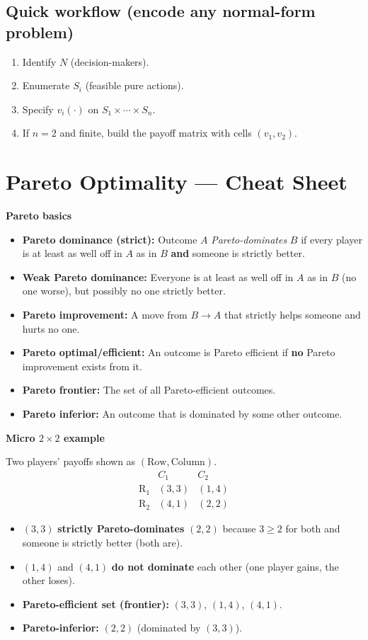 \documentclass[11pt]{article}
\begin{document}
\begin{multicols}{2}
\subsection*{Quick workflow (encode any normal-form problem)}
\begin{enumerate}[label=\arabic*)]
  \item Identify $N$ (decision-makers).
  \item Enumerate $S_i$ (feasible pure actions).
  \item Specify $v_i(\cdot)$ on $S_1\times\cdots\times S_n$.
  \item If $n=2$ and finite, build the payoff matrix with cells $(v_1,v_2)$.
\end{enumerate}


\newpage
\section*{Pareto Optimality — Cheat Sheet}

\textbf{Pareto basics}
\begin{itemize}
  \item \textbf{Pareto dominance (strict):} Outcome $A$ \emph{Pareto-dominates} $B$ if every player is at least as well off in $A$ as in $B$ \textbf{and} someone is strictly better.
  \item \textbf{Weak Pareto dominance:} Everyone is at least as well off in $A$ as in $B$ (no one worse), but possibly no one strictly better.
  \item \textbf{Pareto improvement:} A move from $B \to A$ that strictly helps someone and hurts no one.
  \item \textbf{Pareto optimal/efficient:} An outcome is Pareto efficient if \textbf{no} Pareto improvement exists from it.
  \item \textbf{Pareto frontier:} The set of all Pareto-efficient outcomes.
  \item \textbf{Pareto inferior:} An outcome that is dominated by some other outcome.
\end{itemize}

\textbf{Micro $2\times2$ example}

Two players’ payoffs shown as $(\text{Row}, \text{Column})$.
\[
\begin{array}{c|cc}
    & C_1     & C_2     \\\hline
\text{R}_1 & (3,3)   & (1,4)   \\
\text{R}_2 & (4,1)   & (2,2)
\end{array}
\]
\begin{itemize}
  \item $(3,3)$ \textbf{strictly Pareto-dominates} $(2,2)$ because $3\geq 2$ for both and someone is strictly better (both are).
  \item $(1,4)$ and $(4,1)$ \textbf{do not dominate} each other (one player gains, the other loses).
  \item \textbf{Pareto-efficient set (frontier):} $(3,3)$, $(1,4)$, $(4,1)$.
  \item \textbf{Pareto-inferior:} $(2,2)$ (dominated by $(3,3)$).
\end{itemize}


\end{multicols}
\end{document}
